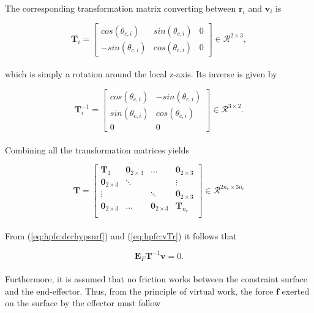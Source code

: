 The corresponding transformation matrix converting between $\mathbf{r}_i$ and $\mathbf{v}_i$ is

\begin{equation} \label{eq:dhpfc_Ti}
    \mathbf{T}_i =
    \begin{bmatrix}
        cos(\theta_{c,i}) & sin(\theta_{c,i}) & 0 \\
        -sin(\theta_{c,i}) & cos(\theta_{c,i}) & 0
    \end{bmatrix} \in \mathcal{R}^{2 \times 3},
\end{equation}
\\
which is simply a rotation around the local z-axis. Its inverse is given by

\begin{equation}\label{eq:Tinv}
    \mathbf{T}^{-1}_i =
    \begin{bmatrix}
        cos(\theta_{c,i}) & -sin(\theta_{c,i}) \\
        sin(\theta_{c,i}) & cos(\theta_{c,i}) \\
        0 & 0
    \end{bmatrix} \in \mathcal{R}^{3 \times 2}.
\end{equation}
\\
Combining all the transformation matrices yields

\begin{equation}
    \mathbf{T} =
    \begin{bmatrix}
        \mathbf{T}_1 & \mathbf{0}_{2\times3} & \dots & \mathbf{0}_{2\times3} \\
        \mathbf{0}_{2\times3} & \ddots & & \vdots \\
        \vdots & & \ddots & \mathbf{0}_{2\times3} \\
        \mathbf{0}_{2\times3} & \dots & \mathbf{0}_{2\times3} & \mathbf{T}_{n_c} \\
    \end{bmatrix} \in \mathcal{R}^{2 n_c \times 3 n_c}
\end{equation}
\\

From (\ref{eq:hpfc:derhypsurf}) and (\ref{eq:hpfc:vTr}) it follows that

\begin{equation}\label{eq:hpfc:EFTv}
    \mathbf{E}_F \mathbf{T}^{-1} \mathbf{v} = 0.
\end{equation}
\\
Furthermore, it is assumed that no friction works between the constraint surface and the end-effector. Thus, from the principle of virtual work, the force $\mathbf{f}$ exerted on the surface by the effector must follow

